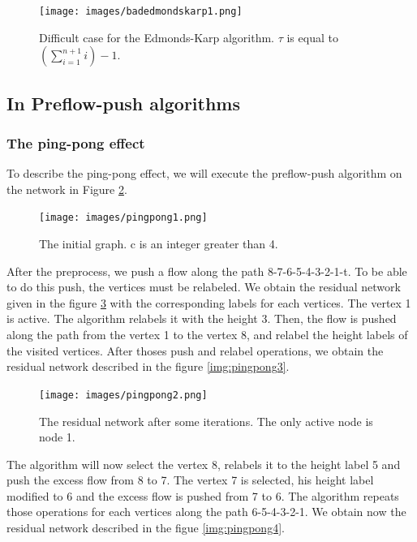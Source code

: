 \begin{figure}
\centering
\texttt{[image: images/badedmondskarp1.png]}
\caption{Difficult case for the Edmonds-Karp algorithm. $\tau$ is equal to $(\sum\limits_{i=1}^{n+1} i) - 1$.}
\label{img:badedmondskarp}
\end{figure}

\subsection{In Preflow-push algorithms}

\subsubsection{The ping-pong effect}

To describe the ping-pong effect, we will execute the preflow-push algorithm on the network in Figure \ref{img:pingpong1}.

\begin{figure}[h]
\centering
\texttt{[image: images/pingpong1.png]}
\caption{The initial graph. c is an integer greater than 4.}
\label{img:pingpong1}
\end{figure}

After the preprocess, we push a flow along the path 8-7-6-5-4-3-2-1-t. To be able to do this push, the vertices must be relabeled. We obtain the residual network given in the figure \ref{img:pingpong2} with the corresponding labels for each vertices. The vertex 1 is active. The algorithm relabels it with the height 3. Then, the flow is pushed along the path from the vertex 1 to the vertex 8, and relabel the height labels of the visited vertices. After thoses push and relabel operations, we obtain the residual network described in the figure \ref{img:pingpong3}.

\begin{figure}[h]
\centering
\texttt{[image: images/pingpong2.png]}
\caption{The residual network after some iterations. The only active node is node 1.}
\label{img:pingpong2}
\end{figure}

The algorithm will now select the vertex 8, relabels it to the height label 5 and push the excess flow from 8 to 7. The vertex 7 is selected, his height label modified to 6 and the excess flow is pushed from 7 to 6. The algorithm repeats those operations for each vertices along the path 6-5-4-3-2-1. We obtain now the residual network described in the figue \ref{img:pingpong4}.

